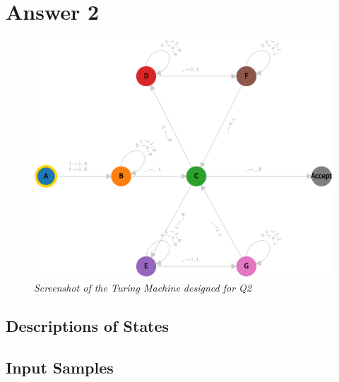 \section*{Answer 2}
\label{answer-2}

\vspace*{\fill}
\begin{figure}[h] %
  \centering
  \includegraphics[width=\linewidth]{answers/img/q2-machine.png}
  \caption{\textit{Screenshot of the Turing Machine designed for Q2}}
  \label{fig:q2-machine}
\end{figure}
\vspace*{\fill}

\newpage

\begin{center} \subsection*{Descriptions of States} \end{center}
\label{q2:description-of-states}



\newpage

\begin{center} \subsection*{Input Samples} \end{center}
\label{q2:input-samples}






